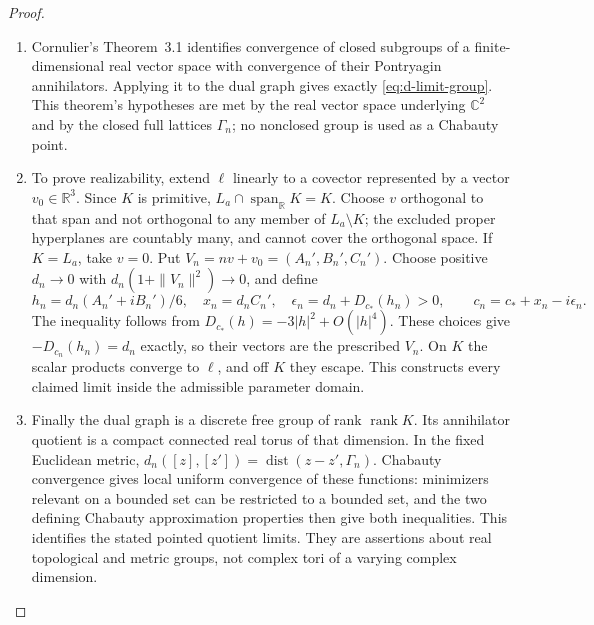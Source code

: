\begin{proof}
\begin{enumerate}[label=\arabic*.,leftmargin=*]
\item Cornulier's Theorem~3.1 identifies convergence of closed subgroups of
a finite-dimensional real vector space with convergence of their
Pontryagin annihilators. Applying it to the dual graph gives exactly
\eqref{eq:d-limit-group}. This theorem's hypotheses are met by the
real vector space underlying \(\mathbb C^2\) and by the closed full
lattices \(\Gamma_n\); no nonclosed group is used as a Chabauty
point.

\item To prove realizability, extend \(\ell\) linearly to a covector
represented by a vector \(v_0\in\mathbb R^3\). Since \(K\) is
primitive, \(L_a\cap\operatorname{span}_{\mathbb R}K=K\).
Choose \(v\) orthogonal to that span and not orthogonal to any member
of \(L_a\setminus K\); the excluded proper hyperplanes are
countably many, and cannot cover the orthogonal space. If
\(K=L_a\), take \(v=0\). Put \(V_n=nv+v_0=(A_n',B_n',C_n')\).
Choose positive \(d_n\to0\) with
\(d_n(1+\|V_n\|^2)\to0\), and define
\[
 h_n=d_n(A_n'+iB_n')/6,\quad x_n=d_nC_n',\quad
 \epsilon_n=d_n+D_{c_*}(h_n)>0,
 \qquad c_n=c_*+x_n-i\epsilon_n.
\]
The inequality follows from \(D_{c_*}(h)=-3|h|^2+O(|h|^4)\).
These choices give \(-D_{c_n}(h_n)=d_n\) exactly, so their vectors
are the prescribed \(V_n\). On \(K\) the scalar products converge
to \(\ell\), and off \(K\) they escape. This constructs every
claimed limit inside the admissible parameter domain.

\item Finally the dual graph is a discrete free group of rank
\(\operatorname{rank}K\). Its annihilator quotient is a compact
connected real torus of that dimension. In the fixed Euclidean metric,
\(d_n([z],[z'])=\operatorname{dist}(z-z',\Gamma_n)\).
Chabauty convergence gives local uniform convergence of these
functions: minimizers relevant on a bounded set can be restricted to
a bounded set, and the two defining Chabauty approximation properties
then give both inequalities. This identifies the stated pointed
quotient limits. They are assertions about real topological and
metric groups, not complex tori of a varying complex dimension.
\end{enumerate}
\end{proof}

